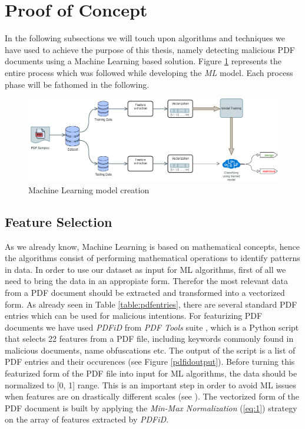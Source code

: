 \section{Proof of Concept}
\label{section:poc}

In the following subsections we will touch upon algorithms and techniques we have used to achieve the purpose of this thesis, namely detecting malicious PDF documents using a Machine Learning based solution. Figure \ref{mlsteps} represents the entire process which was followed while developing the \textit{ML} model. Each process phase will be fathomed in the following.

\begin{figure}[H]
	\centerline{\includegraphics[scale=0.5]{figures/ml.png}}  
	\caption{Machine Learning model creation}
	\label{mlsteps}
\end{figure}

\subsection{Feature Selection}
\label{subsection:featureSelection}
As we already know, Machine Learning is based on mathematical concepts, hence the algorithms consist of performing mathematical operations to identify patterns in data. In order to use our dataset as input for ML algorithms, first of all we need to bring the data in an appropiate form. Therefor the most relevant data from a PDF document should be extracted and transformed into a vectorized form. As already seen in Table \ref{table:pdfentries}, there are several standard PDF entries which can be used for malicious intentions. For featurizing PDF documents we have used \textit{PDFiD} from \textit{PDF Tools} suite \cite{pdftools}, which is a Python script that selects 22 features from a PDF file, including keywords commonly found in malicious documents, name obfuscations etc. The output of the script is a list of PDF entries and their occurences (see Figure \ref{pdfidoutput}). Before turning this featurized form of the PDF file into input for ML algorithms, the data should be normalized to [0, 1] range. This is an important step in order to avoid ML issues when features are on drastically different scales (see \cite{mlCookbook}). The vectorized form of the PDF document is built by applying the \textit{Min-Max Normalization} (\ref{eq:1}) strategy on the array of features extracted by \textit{PDFiD}.


